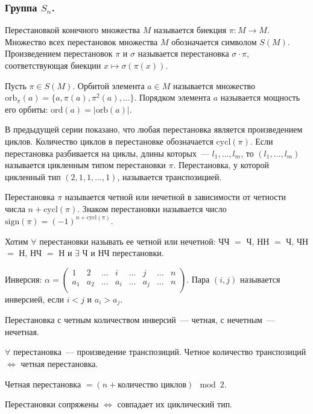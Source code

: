 \documentclass[12pt]{article}
\newcommand{\orb}{\text{orb}}
\newcommand{\ord}{\text{ord}}
\newcommand{\cycl}{\text{cycl}}
\begin{document}
	\subsubsection{Группа $S_n$.}
	\begin{definition}
		Перестановкой конечного множества $M$ называется биекция $\pi : M \rightarrow M $. Множество всех перестановок множества $M$ обозначается символом $S(M)$. Произведением перестановок $\pi$ и $\sigma$ называется перестановка $\sigma \cdot \pi$, соответствующая биекции $x \mapsto \sigma (\pi (x))$.
	\end{definition}
	\begin{definition}
		Пусть $\pi \in S(M)$. Орбитой элемента $a \in M$ называется множество $\orb_{\pi}(a) = \{ a, \pi(a), \pi^2(a), \dots \}$. Порядком элемента $a$ называется мощность его орбиты: $\ord(a) = |\orb(a)|$.
	\end{definition}
	\begin{definition}
		В предыдущей серии показано, что любая перестановка является произведением циклов. Количество циклов в перестановке обозначается $\cycl(\pi)$. Если перестановка разбивается на циклы, длины которых~--- $l_1, \dots, l_m$, то $(l_1, \dots,l_m)$ называется цикленным типом перестановки $\pi$. Перестановка, у которой цикленный тип $(2, 1, 1, \dots, 1)$, называется транспозицией.
	\end{definition}
	\begin{definition}
		Перестановка $\pi$ называется четной или нечетной в зависимости от четности числа $n + \cycl(\pi)$. Знаком перестановки называется число $\text{sign}(\pi) = (-1)^{n + \cycl(\pi)}$.
	\end{definition}
	\begin{definition}
		Хотим $\forall$ перестановки называть ее четной или нечетной: ЧЧ $=$ Ч, НН $=$ Ч, ЧН $=$ Н, НЧ $=$ Н и $\exists$ Ч и НЧ перестановки.
	\end{definition}
	\begin{definition}
		Инверсия: $\alpha = \begin{pmatrix}
			1 & 2 & \dots & i & \dots & j & \dots & n \\
			a_1 & a_2 & \dots & a_i & \dots & a_j & \dots & n \\
		\end{pmatrix}$. Пара $(i, j)$ называется инверсией, если $i < j$ и $a_i > a_j$.
	\end{definition}
	\begin{definition}
		Перестановка с четным количеством инверсий~--- четная, с нечетным~--- нечетная.
	\end{definition}
	\begin{note}
		$\forall$ перестановка~--- произведение транспозиций. Четное количество транспозиций $\Leftrightarrow$ четная перестановка.
	\end{note}
	\begin{definition}
		Четная перестановка $= (n + \text{количество циклов}) \mod{2}$.
	\end{definition}
	\begin{theorem}
		Перестановки сопряжены $\Leftrightarrow$ совпадает их циклический тип.
	\end{theorem}
	
\end{document}
